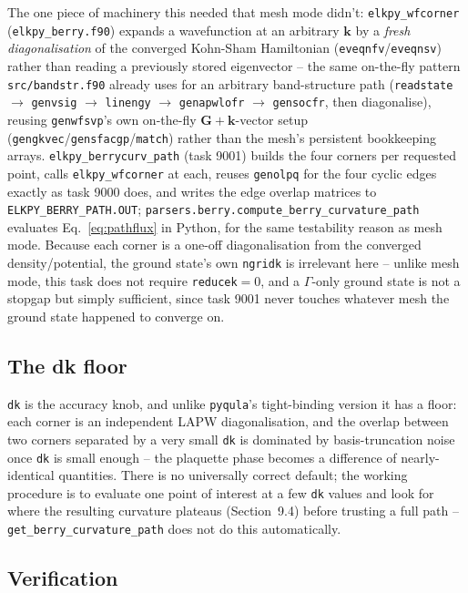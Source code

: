 \documentclass[11pt]{article}
\begin{document}
The one piece of machinery this needed that mesh mode didn't: \texttt{elkpy\_wfcorner}
(\texttt{elkpy\_berry.f90}) expands a wavefunction at an arbitrary $\mathbf k$ by a
\emph{fresh diagonalisation} of the converged Kohn-Sham Hamiltonian
(\texttt{eveqnfv}/\texttt{eveqnsv}) rather than reading a previously stored eigenvector
-- the same on-the-fly pattern \texttt{src/bandstr.f90} already uses for an arbitrary
band-structure path (\texttt{readstate} $\to$ \texttt{genvsig} $\to$ \texttt{linengy}
$\to$ \texttt{genapwlofr} $\to$ \texttt{gensocfr}, then diagonalise), reusing
\texttt{genwfsvp}'s own on-the-fly $\mathbf G+\mathbf k$-vector setup
(\texttt{gengkvec}/\texttt{gensfacgp}/\texttt{match}) rather than the mesh's persistent
bookkeeping arrays. \texttt{elkpy\_berrycurv\_path} (task 9001) builds the four corners
per requested point, calls \texttt{elkpy\_wfcorner} at each, reuses \texttt{genolpq} for
the four cyclic edges exactly as task 9000 does, and writes the edge overlap matrices to
\texttt{ELKPY\_BERRY\_PATH.OUT}; \texttt{parsers.berry.compute\_berry\_curvature\_path}
evaluates Eq.~\eqref{eq:pathflux} in Python, for the same testability reason as mesh
mode. Because each corner is a one-off diagonalisation from the converged
density/potential, the ground state's own \texttt{ngridk} is irrelevant here -- unlike
mesh mode, this task does not require \texttt{reducek}$=0$, and a $\Gamma$-only ground
state is not a stopgap but simply sufficient, since task 9001 never touches whatever
mesh the ground state happened to converge on.

\subsection{The dk floor}

\texttt{dk} is the accuracy knob, and unlike \texttt{pyqula}'s tight-binding version it
has a floor: each corner is an independent LAPW diagonalisation, and the overlap between
two corners separated by a very small \texttt{dk} is dominated by basis-truncation noise
once \texttt{dk} is small enough -- the plaquette phase becomes a difference of
nearly-identical quantities. There is no universally correct default; the working
procedure is to evaluate one point of interest at a few \texttt{dk} values and look for
where the resulting curvature plateaus (Section~9.4) before trusting a full path --
\texttt{get\_berry\_curvature\_path} does not do this automatically.

\subsection{Verification}
\end{document}
